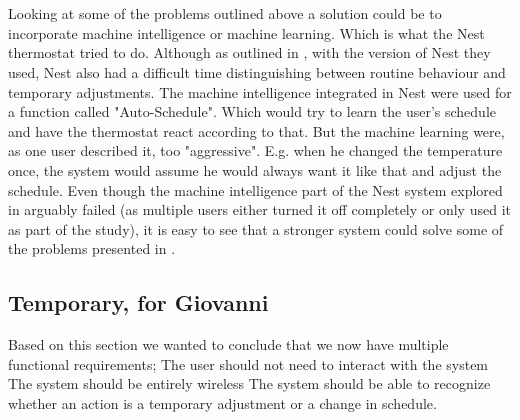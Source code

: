 \\\\
Looking at some of the problems outlined above a solution could be to incorporate machine intelligence or machine learning. Which is what the Nest thermostat\cite{AdaptiveInterviews} tried to do. Although as outlined in \cite{AdaptiveInterviews}, with the version of Nest they used, Nest also had a difficult time distinguishing between routine behaviour and temporary adjustments. The machine intelligence integrated in Nest were used for a function called "Auto-Schedule". Which would try to learn the user's schedule and have the thermostat react according to that. But the machine learning were, as one user described it\cite{AdaptiveInterviews}, too "aggressive". E.g. when he changed the temperature once, the system would assume he would always want it like that and adjust the schedule.
Even though the machine intelligence part of the Nest system explored in \cite{AdaptiveInterviews} arguably failed (as multiple users either turned it off completely or only used it as part of the study), it is easy to see that a stronger system could solve some of the problems presented in \cite{HAInterviews}. 
\subsection{Temporary, for Giovanni}
Based on this section we wanted to conclude that we now have multiple functional requirements;
The user should not need to interact with the system
The system should be entirely wireless
The system should be able to recognize whether an action is a temporary adjustment or a change in schedule.
